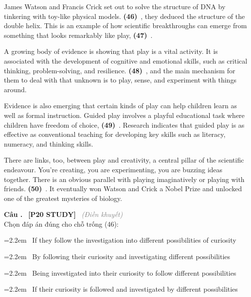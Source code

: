 \documentclass[12pt,a4paper,twoside]{article}
\newcounter{qcounter}
\newcommand{\question}[2][]{%
    \stepcounter{qcounter}%
    \par\vspace{6pt}%
    \noindent\textcolor{primaryBlue}{\textbf{Câu \theqcounter.}}~%
    \textcolor{secondaryBlue}{\small\textbf{[P20 STUDY]}}~%
    \if\relax\detokenize{#1}\relax\else\textcolor{gray}{\small\textit{(#1)}}~\fi\\[1pt]
    \noindent #2%
}
\newcommand{\choiceitem}[2]{%
    \tikz[baseline=-0.5ex]{%
        \node[draw=primaryBlue, circle, minimum size=1.5em, inner sep=0pt, thick] {\textbf{#1}};%
    }~#2%
}
\newenvironment{readingpassage}[1][]{%
    \begin{tcolorbox}[enhanced, colback=grayLight, colframe=secondaryBlue,
        coltitle=textDark, fonttitle=\bfseries, title={#1},
        rounded corners, arc=3mm, boxrule=1pt,
        left=15pt, right=15pt, top=10pt, bottom=10pt,
        breakable, before skip=10pt, after skip=10pt, drop fuzzy shadow]
    \setstretch{1.3}
}{\end{tcolorbox}}
\begin{document}
\begin{readingpassage}[]
James Watson and Francis Crick set out to solve the structure of DNA by tinkering with toy-like physical models. \textbf{(46)}~\underline{\hspace{1.3cm}}, they deduced the structure of the double helix. This is an example of how scientific breakthroughs can emerge from something that looks remarkably like play, \textbf{(47)}~\underline{\hspace{1.3cm}}.

A growing body of evidence is showing that play is a vital activity. It is associated with the development of cognitive and emotional skills, such as critical thinking, problem-solving, and resilience. \textbf{(48)}~\underline{\hspace{1.3cm}}, and the main mechanism for them to deal with that unknown is to play, sense, and experiment with things around.

Evidence is also emerging that certain kinds of play can help children learn as well as formal instruction. Guided play involves a playful educational task where children have freedom of choice, \textbf{(49)}~\underline{\hspace{1.3cm}}. Research indicates that guided play is as effective as conventional teaching for developing key skills such as literacy, numeracy, and thinking skills.

There are links, too, between play and creativity, a central pillar of the scientific endeavour. You're creating, you are experimenting, you are buzzing ideas together. There is an obvious parallel with playing imaginatively or playing with friends. \textbf{(50)}~\underline{\hspace{1.3cm}}. It eventually won Watson and Crick a Nobel Prize and unlocked one of the greatest mysteries of biology.
\end{readingpassage}

\question[Điền khuyết]{Chọn đáp án đúng cho chỗ trống (46):}

\par\vspace{4pt}
\noindent\hangindent=2.2em\choiceitem{A}{If they follow the investigation into different possibilities of curiosity}\par\vspace{4pt}
\noindent\hangindent=2.2em\choiceitem{B}{By following their curiosity and investigating different possibilities}\par\vspace{4pt}
\noindent\hangindent=2.2em\choiceitem{C}{Being investigated into their curiosity to follow different possibilities}\par\vspace{4pt}
\noindent\hangindent=2.2em\choiceitem{D}{If their curiosity is followed and investigated by different possibilities}\par\vspace{4pt}
\end{document}
